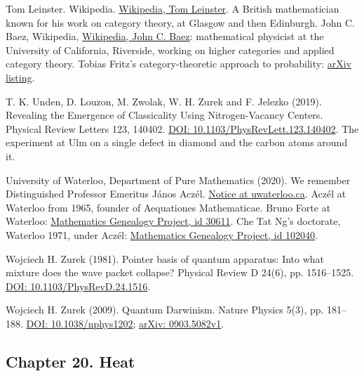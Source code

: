 \documentclass[11pt,twoside]{article}
\theoremstyle{thielethm}
\theoremstyle{thieledef}
\theoremstyle{thieledef}
\theoremstyle{thieledef}
\theoremstyle{thielethm}
\theoremstyle{thieleobs}
\theoremstyle{thielethm}
\begin{document}
\noindent Tom Leinster. Wikipedia. \href{https://en.wikipedia.org/wiki/Tom_Leinster}{Wikipedia, Tom Leinster}. A British mathematician known for his work on category theory, at Glasgow and then Edinburgh. John C. Baez, Wikipedia, \href{https://en.wikipedia.org/wiki/John_C._Baez}{Wikipedia, John C. Baez}: mathematical physicist at the University of California, Riverside, working on higher categories and applied category theory. Tobias Fritz's category-theoretic approach to probability: \href{https://arxiv.org/a/fritz_t_1}{arXiv listing}.
\par\medskip

\noindent T. K. Unden, D. Louzon, M. Zwolak, W. H. Zurek and F. Jelezko (2019). Revealing the Emergence of Classicality Using Nitrogen-Vacancy Centers. Physical Review Letters 123, 140402. \href{https://doi.org/10.1103/PhysRevLett.123.140402}{DOI: 10.1103/PhysRevLett.123.140402}. The experiment at Ulm on a single defect in diamond and the carbon atoms around it.
\par\medskip

\noindent University of Waterloo, Department of Pure Mathematics (2020). We remember Distinguished Professor Emeritus János Aczél. \href{https://uwaterloo.ca/pure-mathematics/news/we-remember-distinguished-professor-emeritus-janos-aczel}{Notice at uwaterloo.ca}. Aczél at Waterloo from 1965, founder of Aequationes Mathematicae. Bruno Forte at Waterloo: \href{https://mathgenealogy.com/id.php?id=30611}{Mathematics Genealogy Project, id 30611}. Che Tat Ng's doctorate, Waterloo 1971, under Aczél: \href{https://mathgenealogy.org/id.php?id=102040}{Mathematics Genealogy Project, id 102040}.
\par\medskip

\noindent Wojciech H. Zurek (1981). Pointer basis of quantum apparatus: Into what mixture does the wave packet collapse? Physical Review D 24(6), pp. 1516--1525. \href{https://doi.org/10.1103/PhysRevD.24.1516}{DOI: 10.1103/PhysRevD.24.1516}.
\par\medskip

\noindent Wojciech H. Zurek (2009). Quantum Darwinism. Nature Physics 5(3), pp. 181--188. \href{https://doi.org/10.1038/nphys1202}{DOI: 10.1038/nphys1202}; \href{https://arxiv.org/abs/0903.5082v1}{arXiv: 0903.5082v1}.
\par\medskip

\subsection*{Chapter 20. Heat}
\end{document}
